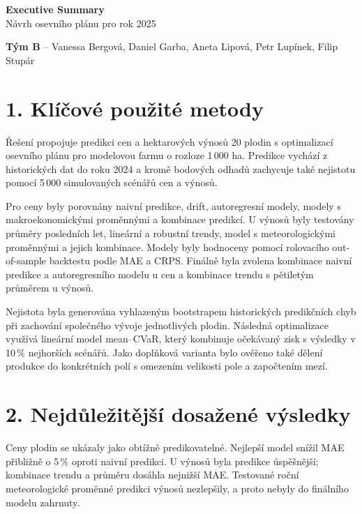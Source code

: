 \documentclass[11pt,a4paper]{article}
\begin{document}
\begin{center}
    {\Large\textbf{Executive Summary}}\\[1pt]
    {\normalsize Návrh osevního plánu pro rok 2025}
\end{center}

\begin{center}
    \textbf{Tým B} -- Vanessa Bergová, Daniel Garba, Aneta Lipová, Petr Lupínek, Filip Stupár
\end{center}

\vspace{-0.2cm}

\section*{1. Klíčové použité metody}

Řešení propojuje predikci cen a hektarových výnosů 20 plodin s optimalizací
osevního plánu pro modelovou farmu o rozloze 1\,000 ha. Predikce vychází
z historických dat do roku 2024 a kromě bodových odhadů zachycuje také
nejistotu pomocí 5\,000 simulovaných scénářů cen a výnosů.

Pro ceny byly porovnány naivní predikce, drift, autoregresní modely,
modely s makroekonomickými proměnnými a kombinace predikcí. U výnosů byly
testovány průměry posledních let, lineární a robustní trendy, model
s meteorologickými proměnnými a jejich kombinace. Modely byly hodnoceny
pomocí rolovacího out-of-sample backtestu podle MAE a CRPS. Finálně byla
zvolena kombinace naivní predikce a autoregresního modelu u cen a kombinace
trendu s pětiletým průměrem u výnosů.

Nejistota byla generována vyhlazeným bootstrapem historických predikčních
chyb při zachování společného vývoje jednotlivých plodin. Následná
optimalizace využívá lineární model mean--CVaR, který kombinuje očekávaný
zisk s výsledky v 10\,\% nejhorších scénářů. Jako doplňková varianta bylo
ověřeno také dělení produkce do konkrétních polí s omezením velikosti pole
a započtením mezí.

\vspace{-0.2cm}

\section*{2. Nejdůležitější dosažené výsledky}

Ceny plodin se ukázaly jako obtížně predikovatelné. Nejlepší model snížil
MAE přibližně o 5\,\% oproti naivní predikci. U výnosů byla predikce
úspěšnější; kombinace trendu a průměru dosáhla nejnižší MAE. Testované
roční meteorologické proměnné predikci výnosů nezlepšily, a proto nebyly
do finálního modelu zahrnuty.
\end{document}

